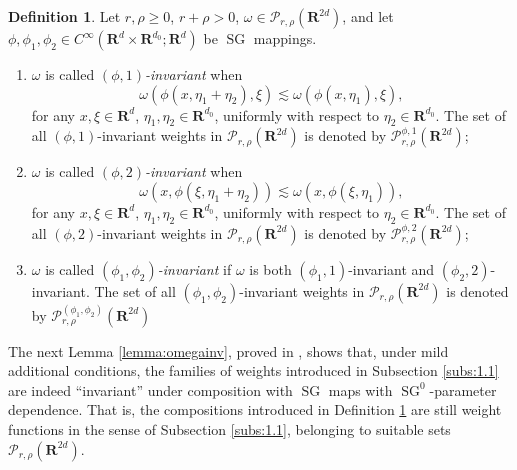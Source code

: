 \documentclass[12pt,a4paper,reqno]{amsart}
\numberwithin{equation}{section}
\numberwithin{thm}{section}
\theoremstyle{definition}
\newtheorem{defn}[thm]{Definition}
\theoremstyle{remark}
\begin{document}
\par

\begin{defn}\label{def:omegainv}
	Let $r,\rho \ge 0$, $r+\rho >0$, $\omega \in {\mathscr P}_{r,\rho}
	({\mathbf R^{{2d}}})$, and let $\phi ,\phi _1,\phi _2\in C^\infty ({\mathbf R^{{d}}}\times
	{\mathbf R^{{d_0}}};{\mathbf R^{d}})$
	be ${\operatorname{SG}}$ mappings.
		\begin{enumerate}
				\item $\omega$ is called \emph{$(\phi,1)$-invariant}
		when
				\[
			\omega(\phi(x,\eta _1+\eta _2),\xi )\lesssim
			\omega
			(\phi(x,\eta _1),\xi ),
		\]
				for any $x, \xi \in {\mathbf R^{{d}}}$, $\eta _1,\eta _2\in {\mathbf R^{{d_0}}}$, uniformly with
		respect to $\eta _2\in {\mathbf R^{{d_0}}}$. The set of all $(\phi,1)$-invariant
		weights in ${\mathscr P} _{r,\rho}({\mathbf R^{{2d}}})$ is denoted by
		${\mathscr P}_{r,\rho}^{\phi,1}({\mathbf R^{{2d}}})$;
				\item $\omega$ is called \emph{$(\phi,2)$-invariant}
		when
				\[
			\omega(x,\phi(\xi ,\eta _1+\eta _2))\lesssim
			\omega
			(x,\phi(\xi ,\eta _1)),
		\]
				for any $x, \xi \in {\mathbf R^{{d}}}$, $\eta _1,\eta _2\in {\mathbf R^{{d_0}}}$, uniformly with
		respect to $\eta _2\in {\mathbf R^{{d_0}}}$. The set of all $(\phi,2)$-invariant
		weights in ${\mathscr P} _{r,\rho}({\mathbf R^{{2d}}})$ is denoted by
		${\mathscr P}_{r,\rho}^{\phi,2}({\mathbf R^{{2d}}})$;
			\item $\omega$ is called \emph{$(\phi _1,\phi _2)$-invariant}
		if $\omega$ is both $(\phi _1,1)$-invariant and $(\phi _2,2)$-invariant.
		The set of all $(\phi _1,\phi _2)$-invariant
		weights in ${\mathscr P} _{r,\rho}({\mathbf R^{{2d}}})$ is denoted by
		${\mathscr P}_{r,\rho}^{(\phi_1,\phi _2)}({\mathbf R^{{2d}}})$
	\end{enumerate}
	\end{defn}

\par

The next Lemma \ref{lemma:omegainv}, proved in \cite{CoTo2}, shows that, under mild additional conditions, 
the families of weights introduced in Subsection 
\ref{subs:1.1} are indeed ``invariant'' under composition
with ${\operatorname{SG}}$ maps with ${\operatorname{SG}}^0$-parameter dependence.
That is, the compositions introduced in Definition
\ref{def:omegainv} are still weight functions in the sense
of Subsection \ref{subs:1.1}, belonging to suitable sets
$\mathscr{P}_{r,\rho}({\mathbf R^{{2d}}})$.
\end{document}
